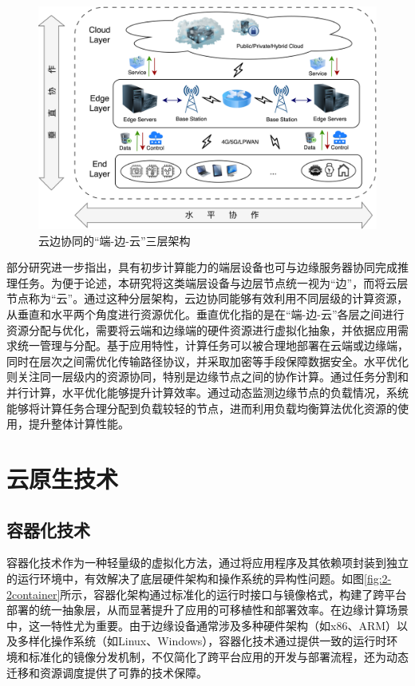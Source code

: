 \begin{figure}[ht]
  \centering
  \includegraphics[width=\linewidth]{pics/2-1云边端架构.png}
  \caption{云边协同的“端-边-云”三层架构\cite{mao2017survey,satyanarayanan2017emergence,吴大鹏2018端}}
  \label{fig:2-1云边端架构}
\end{figure}

部分研究\cite{lane2016deepx,teerapittayanon2017distributed,liu2023adaptive}进一步指出，具有初步计算能力的端层设备也可与边缘服务器协同完成推理任务。为便于论述，本研究将这类端层设备与边层节点统一视为“边”，而将云层节点称为“云”。通过这种分层架构，云边协同能够有效利用不同层级的计算资源，从垂直和水平两个角度进行资源优化\cite{dupont2017edge,li2020elastic}。垂直优化指的是在“端-边-云”各层之间进行资源分配与优化，需要将云端和边缘端的硬件资源进行虚拟化抽象，并依据应用需求统一管理与分配。基于应用特性，计算任务可以被合理地部署在云端或边缘端，同时在层次之间需优化传输路径协议，并采取加密等手段保障数据安全。水平优化则关注同一层级内的资源协同，特别是边缘节点之间的协作计算。通过任务分割和并行计算，水平优化能够提升计算效率。通过动态监测边缘节点的负载情况，系统能够将计算任务合理分配到负载较轻的节点，进而利用负载均衡算法优化资源的使用，提升整体计算性能。

\section{云原生技术}

\subsection{容器化技术}

容器化技术作为一种轻量级的虚拟化方法，通过将应用程序及其依赖项封装到独立的运行环境中，有效解决了底层硬件架构和操作系统的异构性问题。如图\ref{fig:2-2container}所示，容器化架构通过标准化的运行时接口与镜像格式，构建了跨平台部署的统一抽象层，从而显著提升了应用的可移植性和部署效率。在边缘计算场景中，这一特性尤为重要。由于边缘设备通常涉及多种硬件架构（如x86、ARM）以及多样化操作系统（如Linux、Windows），容器化技术通过提供一致的运行时环境和标准化的镜像分发机制，不仅简化了跨平台应用的开发与部署流程，还为动态迁移和资源调度提供了可靠的技术保障\cite{urblik2024containerization}。

